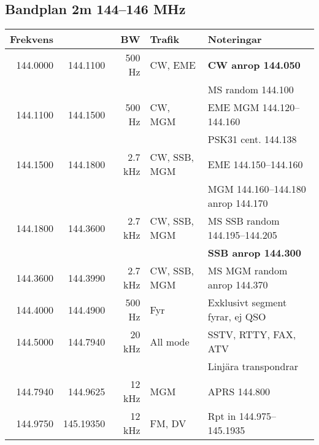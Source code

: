 \documentclass[10pt,swedish,a4paper]{article}
\begin{document}
\begin{landscape}
\section{Bandplan 2m 144--146 MHz}
\begin{tabular}{rrrll}
	\textbf{Frekvens} &           & \textbf{BW} & \textbf{Trafik} & \textbf{Noteringar}                     \\ \hline
	         144.0000 &  144.1100 &          500 Hz & CW, EME         & \textbf{CW anrop 144.050}                       \\
	                  &           &                 &                 & MS random 144.100                       \\ \hline
	         144.1100 &  144.1500 &          500 Hz & CW, MGM         & EME MGM 144.120--144.160                \\
	                  &           &                 &                 & PSK31 cent. 144.138                     \\ \hline
	         144.1500 &  144.1800 &         2.7 kHz & CW, SSB, MGM    & EME 144.150--144.160                    \\
	                  &           &                 &                 & MGM 144.160--144.180 anrop 144.170      \\ \hline
	         144.1800 &  144.3600 &         2.7 kHz & CW, SSB, MGM    & MS SSB random 144.195--144.205          \\
	                  &           &                 &                 & \textbf{SSB anrop 144.300}              \\ \hline
	         144.3600 &  144.3990 &         2.7 kHz & CW, SSB, MGM    & MS MGM random anrop 144.370             \\ \hline
	         144.4000 &  144.4900 &          500 Hz & Fyr             & Exklusivt segment fyrar, ej QSO         \\ \hline
	         144.5000 &  144.7940 &          20 kHz & All mode        & SSTV, RTTY, FAX, ATV                    \\
	                  &           &                 &                 & Linjära transpondrar                    \\ \hline
	         144.7940 &  144.9625 &          12 kHz & MGM             & APRS 144.800                            \\ \hline
	         144.9750 & 145.19350 &          12 kHz & FM, DV          & Rpt in 144.975--145.1935                \\

\end{tabular}
\end{landscape}
\end{document}
